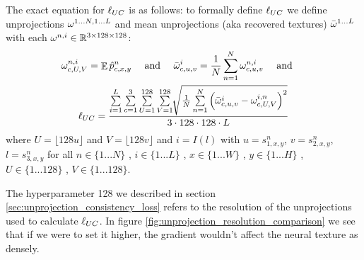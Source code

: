 	The exact equation for $\ell_{UC}$ is as follows:
	to formally define $\ell_{UC}$ we define unprojections $\omega^{1...N,1...L}$ and mean unprojections (aka recovered textures) $\bar{\omega}^{1...L}$ 
	with each $\omega^{n,i}\in\mathbb{R}^{3\times128\times128}$:
	\begin{multline}
		\omega_{c,U,V}^{n,i}=\mathop{\mathbb{E}}\hat{p}_{c,x,y}^n 
		\ \ \ \text{ and }\ \ \  \bar{\omega}^i_{c,u,v}   =   
			\frac{1}{N} \sum\limits_{n=1}^N\omega^{n,i}_{c,u,v} 
		\ \ \ \text{ and }\ \ \  \\
		\ell_{UC}=\frac{\sum\limits_{i=1}^L\sum\limits_{c=1}^3\sum\limits_{U=1}^{128}\sum\limits_{V=1}^{128}
		\sqrt[]{\frac{1}{N}\sum\limits_{n=1}^N\left(\bar{\omega}^i_{c,u,v}-\omega^{i,n}_{c,U,V}\right)^2}}
		{3\cdot128\cdot128\cdot L}
	\end{multline}
	where $U=\lfloor128u\rfloor$ and $V=\lfloor128v\rfloor$ and $i=I(l)$ with
	$u=s^n_{1,x,y}$, $v=s^n_{2,x,y}$, $l=s^n_{3,x,y}$
	for all 
	$n \in \{1...N\}$ , 
	$i \in \{1...L\}$ , 
	$x \in \{1...W\}$ , 
	$y \in \{1...H\}$ , 
	$U \in \{1...128\}$ , 
	$V \in \{1...128\}$.

	\bigskip
	
	The hyperparameter 128 we described in section \ref{sec:unprojection_consistency_loss} refers to the resolution of the unprojections used to calculate $\ell_{UC}$.
	In figure \ref{fig:unprojection_resolution_comparison} we see that if we were to set it higher, the gradient wouldn't affect the neural texture as densely.

